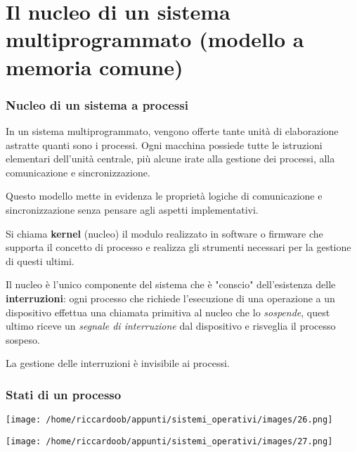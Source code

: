 \chapter{Il nucleo di un sistema multiprogrammato (modello a memoria comune)}

\subsection{Nucleo di un sistema a processi}
In un sistema multiprogrammato, vengono offerte tante unità di elaborazione astratte quanti sono i processi. Ogni macchina possiede tutte le istruzioni elementari dell'unità centrale, più alcune irate alla gestione dei processi, alla comunicazione e sincronizzazione.

Questo modello mette in evidenza le proprietà logiche di comunicazione e sincronizzazione senza pensare agli aspetti implementativi.

\begin{mdframed}[topline=false,bottomline=false,rightline=false]
Si chiama \textbf{kernel} (nucleo) il modulo realizzato in software o firmware che supporta il concetto di processo e realizza gli strumenti necessari per la gestione di questi ultimi.
\end{mdframed}

Il nucleo è l'unico componente del sistema che è "conscio" dell'esistenza delle \textbf{interruzioni}:
ogni processo che richiede l'esecuzione di una operazione a un dispositivo effettua una chiamata primitiva al nucleo che lo \textit{sospende}, quest ultimo riceve un \textit{segnale di interruzione} dal dispositivo e risveglia il processo sospeso.

La gestione delle interruzioni è invisibile ai processi.

\subsection{Stati di un processo}

\begin{multicols}{2}
\begin{multicolfigure}
    \centering
    \texttt{[image: /home/riccardoob/appunti/sistemi\_operativi/images/26.png]}
\end{multicolfigure}
\columnbreak
\begin{multicolfigure}
    \centering
    \texttt{[image: /home/riccardoob/appunti/sistemi\_operativi/images/27.png]}
\end{multicolfigure}    
\end{multicols}

